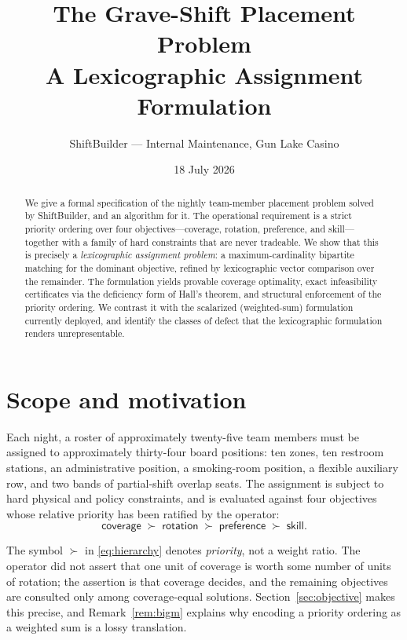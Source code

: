 \documentclass[11pt,a4paper]{article}
\title{\bfseries The Grave-Shift Placement Problem\\[0.35em]
\large A Lexicographic Assignment Formulation}
\author{ShiftBuilder --- Internal Maintenance, Gun Lake Casino}
\date{18 July 2026}
\theoremstyle{definition}
\theoremstyle{remark}
\begin{document}
\maketitle

\begin{abstract}
\noindent
We give a formal specification of the nightly team-member placement problem
solved by ShiftBuilder, and an algorithm for it. The operational requirement
is a strict priority ordering over four objectives---coverage, rotation,
preference, and skill---together with a family of hard constraints that are
never tradeable. We show that this is precisely a \emph{lexicographic
assignment problem}: a maximum-cardinality bipartite matching for the
dominant objective, refined by lexicographic vector comparison over the
remainder. The formulation yields provable coverage optimality, exact
infeasibility certificates via the deficiency form of Hall's theorem, and
structural enforcement of the priority ordering. We contrast it with the
scalarized (weighted-sum) formulation currently deployed, and identify the
classes of defect that the lexicographic formulation renders
unrepresentable.
\end{abstract}

\section{Scope and motivation}

Each night, a roster of approximately twenty-five team members must be
assigned to approximately thirty-four board positions: ten zones, ten
restroom stations, an administrative position, a smoking-room position, a
flexible auxiliary row, and two bands of partial-shift overlap seats. The
assignment is subject to hard physical and policy constraints, and is
evaluated against four objectives whose relative priority has been ratified
by the operator:
\begin{equation}
\label{eq:hierarchy}
\textsf{coverage} \;\succ\; \textsf{rotation} \;\succ\;
\textsf{preference} \;\succ\; \textsf{skill}.
\end{equation}

The symbol $\succ$ in \eqref{eq:hierarchy} denotes \emph{priority}, not a
weight ratio. The operator did not assert that one unit of coverage is worth
some number of units of rotation; the assertion is that coverage decides,
and the remaining objectives are consulted only among coverage-equal
solutions. Section~\ref{sec:objective} makes this precise, and
Remark~\ref{rem:bigm} explains why encoding a priority ordering as a weighted
sum is a lossy translation.
\end{document}
